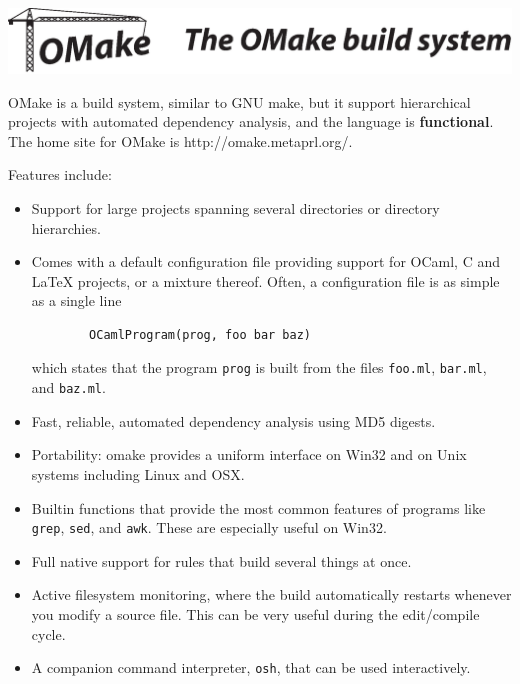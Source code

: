 \documentclass[12pt]{article}
\begin{document}
\includegraphics[scale=0.85]{omake}

OMake is a build system, similar to GNU make, but it support
hierarchical projects with automated dependency analysis, and the
language is {\bf functional}.  The home site for OMake is {\sf
http://omake.metaprl.org/}.

Features include:
\begin{itemize}
\item Support for large projects spanning several directories or
     directory hierarchies.

\item Comes with a default configuration file providing support for OCaml,
     C and LaTeX projects, or a mixture thereof.
     Often, a configuration file is as simple as a single line

\begin{verbatim}
        OCamlProgram(prog, foo bar baz)
\end{verbatim}

     which states that the program \verb+prog+ is built from the files
     \verb+foo.ml+, \verb+bar.ml+, and \verb+baz.ml+.

\item Fast, reliable, automated dependency analysis using MD5 digests.

\item Portability: omake provides a uniform interface on Win32 and
     on Unix systems including Linux and OSX.

\item Builtin functions that provide the most common features of programs
     like \verb+grep+, \verb+sed+, and \verb+awk+.  These are especially useful on Win32.

\item Full native support for rules that build several things at once.

\item Active filesystem monitoring, where the build automatically restarts
     whenever you modify a source file.  This can be very useful during
     the edit/compile cycle.

\item A companion command interpreter, \verb+osh+, that can be used interactively.
\end{itemize}
\end{document}
